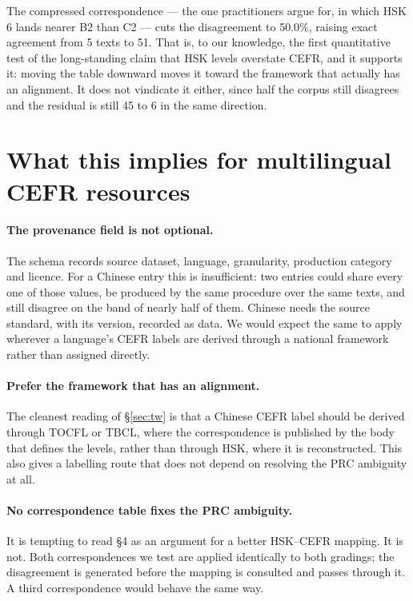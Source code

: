 \documentclass[11pt]{article}
\begin{document}
The compressed correspondence --- the one practitioners argue for, in which HSK
6 lands nearer B2 than C2 --- cuts the disagreement to 50.0\%, raising exact
agreement from 5 texts to 51. That is, to our knowledge, the first quantitative
test of the long-standing claim that HSK levels overstate CEFR, and it supports
it: moving the table downward moves it toward the framework that actually has
an alignment. It does not vindicate it either, since half the corpus still
disagrees and the residual is still 45 to 6 in the same direction.

\section{What this implies for multilingual CEFR resources}

\paragraph{The provenance field is not optional.} The
\citet{imperial2025universalcefr} schema records source dataset, language,
granularity, production category and licence. For a Chinese entry this is
insufficient: two entries could share every one of those values, be produced by
the same procedure over the same texts, and still disagree on the band of
nearly half of them. Chinese needs the source standard, with its version,
recorded as data. We would expect the same to apply wherever a language's CEFR
labels are derived through a national framework rather than assigned directly.

\paragraph{Prefer the framework that has an alignment.} The cleanest reading of
\S\ref{sec:tw} is that a Chinese CEFR label should be derived through TOCFL or
TBCL, where the correspondence is published by the body that defines the
levels, rather than through HSK, where it is reconstructed. This also gives a
labelling route that does not depend on resolving the PRC ambiguity at all.

\paragraph{No correspondence table fixes the PRC ambiguity.} It is tempting to
read \S4 as an argument for a better HSK--CEFR mapping. It is not. Both correspondences we
test are applied identically to both gradings; the disagreement is generated
before the mapping is consulted and passes through it. A third correspondence
would behave the same way.
\end{document}
